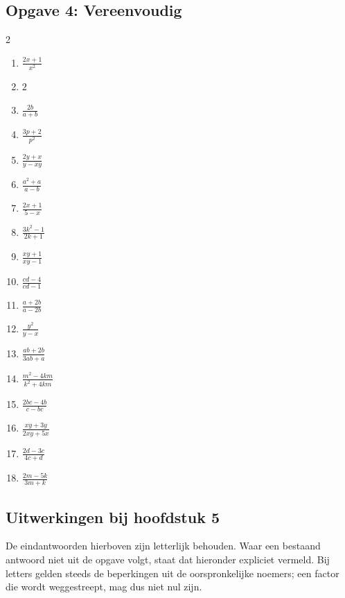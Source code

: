 \subsection*{Opgave 4: Vereenvoudig}
\begin{multicols}{2}
\begin{enumerate}[label=\alph*)]
    \item $\frac{2x+1}{x^2}$
    \item $2$
    \item $\frac{2b}{a+b}$
    \item $\frac{3p+2}{p^2}$
    \item $\frac{2y+x}{y-xy}$
    \item $\frac{a^2+a}{a-b}$
    \item $\frac{2x+1}{5-x}$
    \item $\frac{3k^2-1}{2k+1}$
    \item $\frac{xy+1}{xy-1}$
    \item $\frac{cd-4}{cd-1}$
    \item $\frac{a+2b}{a-2b}$
    \item $\frac{y^2}{y-x}$
    \item $\frac{ab+2b}{3ab+a}$
    \item $\frac{m^2-4km}{k^2+4km}$
    \item $\frac{2bc-4b}{c-bc}$
    \item $\frac{xy+3y}{2xy+5x}$
    \item $\frac{2d-3c}{4c+d}$
    \item $\frac{2m-5k}{3m+k}$
\end{enumerate}
\end{multicols}

\subsection*{Uitwerkingen bij hoofdstuk 5}
De eindantwoorden hierboven zijn letterlijk behouden. Waar een bestaand
antwoord niet uit de opgave volgt, staat dat hieronder expliciet vermeld.
Bij letters gelden steeds de beperkingen uit de oorspronkelijke noemers;
een factor die wordt weggestreept, mag dus niet nul zijn.

